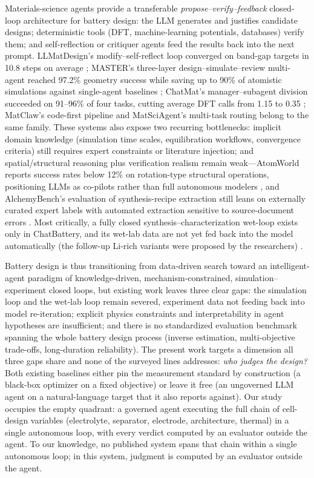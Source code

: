 Materials-science agents provide a transferable
\emph{propose--verify--feedback} closed-loop architecture for battery
design: the LLM generates and justifies candidate designs; deterministic
tools (DFT, machine-learning potentials, databases) verify them; and
self-reflection or critiquer agents feed the results back into the next
prompt. LLMatDesign's modify--self-reflect loop converged on band-gap
targets in 10.8 steps on average \cite{jia2024llmadesign}; MASTER's
three-layer design--simulate--review multi-agent reached 97.2\% geometry
success while saving up to 90\% of atomistic simulations against
single-agent baselines \cite{rothfarb2025hierarchical}; ChatMat's
manager--subagent division succeeded on 91--96\% of four tasks, cutting
average DFT calls from 1.15 to 0.35 \cite{chatmat2026}; MatClaw's
code-first pipeline \cite{matclaw2026} and MatSciAgent's multi-task routing
\cite{matsciagent2025} belong to the same family. These systems also expose
two recurring bottlenecks: implicit domain knowledge (simulation time
scales, equilibration workflows, convergence criteria) still requires
expert constraints or literature injection; and spatial/structural
reasoning plus verification realism remain weak---AtomWorld reports success
rates below 12\% on rotation-type structural operations, positioning LLMs
as co-pilots rather than full autonomous modelers \cite{atomworld2025},
and AlchemyBench's evaluation of synthesis-recipe extraction still leans
on externally curated expert labels with automated extraction sensitive
to source-document errors \cite{alchemybench2025}. Most critically, a fully closed
synthesis--characterization wet-loop exists only in ChatBattery, and its
wet-lab data are not yet fed back into the model automatically (the
follow-up Li-rich variants were proposed by the researchers)
\cite{chatbattery2025}.

Battery design is thus transitioning from data-driven search toward an
intelligent-agent paradigm of knowledge-driven, mechanism-constrained,
simulation--experiment closed loops, but existing work leaves three clear
gaps: the simulation loop and the wet-lab loop remain severed, experiment
data not feeding back into model re-iteration; explicit physics
constraints and interpretability in agent hypotheses are insufficient; and
there is no standardized evaluation benchmark spanning the whole battery
design process (inverse estimation, multi-objective trade-offs,
long-duration reliability). The present work targets a dimension all three
gaps share and none of the surveyed lines addresses: \emph{who judges the
design?} Both existing baselines either pin the measurement standard by
construction (a
black-box optimizer on a fixed objective) or leave it free (an ungoverned
LLM agent on a natural-language target that it also reports against).
Our study occupies the empty quadrant: a governed agent executing the full
chain of cell-design variables (electrolyte, separator, electrode,
architecture, thermal) in a single autonomous loop, with every verdict
computed by an evaluator outside the agent. To our knowledge, no
published system spans that chain within a single autonomous loop; in this
system, judgment is computed by an evaluator outside the agent.

